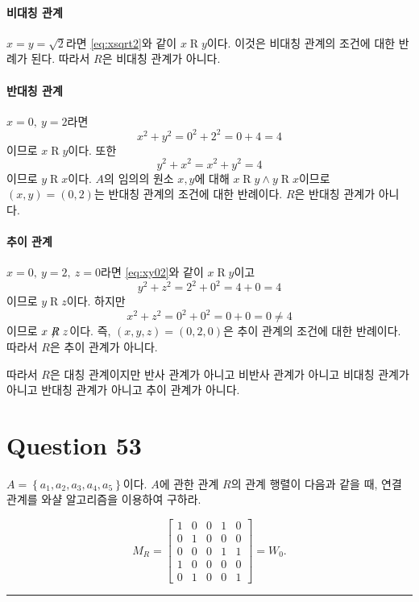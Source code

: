 \documentclass{oblivoir}
\newenvironment{question}{ }{ \par\noindent\rule{\textwidth}{0.4pt} }
\begin{document}
\paragraph{비대칭 관계}
$x = y = \sqrt 2$라면 \eqref{eq:xsqrt2}와 같이 $x \mathrel R y$이다.
이것은 비대칭 관계의 조건에 대한 반례가 된다.
따라서 $R$은 비대칭 관계가 아니다.

\paragraph{반대칭 관계}
$x = 0,\ y = 2$라면
\begin{equation}\label{eq:xy02}
    x^2 + y^2 = 0^2 + 2^2 = 0 + 4 = 4
\end{equation}
이므로 $x \mathrel R y$이다.
또한
\begin{equation}
    y^2 + x^2 = x^2 + y^2 = 4
\end{equation}
이므로 $y \mathrel R x$이다.
$A$의 임의의 원소 $x, y$에 대해 $x \mathrel R y \wedge y \mathrel R x$이므로
$(x,y) = (0, 2)$는 반대칭 관계의 조건에 대한 반례이다.
$R$은 반대칭 관계가 아니다.

\paragraph{추이 관계}
$x = 0,\ y = 2,\ z = 0$라면 \eqref{eq:xy02}와 같이 $x \mathrel R y$이고
\begin{equation}
    y^2 + z^2 = 2^2 + 0^2 = 4 + 0 = 4
\end{equation}
이므로 $y \mathrel R z$이다.
하지만
\begin{equation}
    x^2 + z^2 = 0^2 + 0^2 = 0 + 0 = 0 \neq 4
\end{equation}
이므로 $x \not \mathrel R z$이다.
즉, $(x,y,z) = (0,2,0)$은 추이 관계의 조건에 대한 반례이다.
따라서 $R$은 추이 관계가 아니다.

따라서 $R$은 대칭 관계이지만
반사 관계가 아니고 비반사 관계가 아니고 비대칭 관계가 아니고
반대칭 관계가 아니고 추이 관계가 아니다.

\section{Question 53}
\begin{question}
    $A = \left\{ a_1, a_2, a_3, a_4, a_5 \right\}$이다.
    $A$에 관한 관계 $R$의 관계 행렬이 다음과 같을 때,
    연결 관계를 와샬 알고리즘을 이용하여 구하라.

    \begin{equation}
        M_R = \begin{bmatrix}
            1 & 0 & 0 & 1 & 0 \\
            0 & 1 & 0 & 0 & 0 \\
            0 & 0 & 0 & 1 & 1 \\
            1 & 0 & 0 & 0 & 0 \\
            0 & 1 & 0 & 0 & 1
        \end{bmatrix} = W_0.
    \end{equation}
\end{question}
\end{document}
